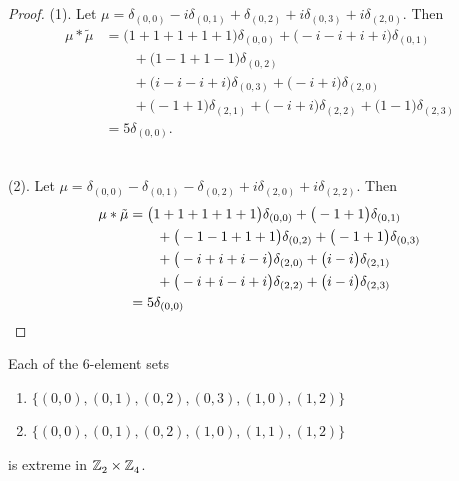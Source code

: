  
\begin{proof} (1).
Let  $\mu =  \delta_{(0,0)}-i\delta_{(0,1)}+\delta_{(0,2)}+i\delta_{(0,3)}+i\delta_{(2,0)}
$.  Then 
\begin{align*} 
\mu * \tilde \mu & = \big(1+1+1+1+1\big)\delta_{(0,0)}
+\big(-i-i+i+i\big)\delta_{(0,1)}
\\&\qquad
+\big(1-1+1-1\big)\delta_{(0,2)}
\\&\qquad
+\big(i-i-i+i\big)\delta_{(0,3)}
+\big(-i+i\big)\delta_{(2,0)}
\\&\qquad
+\big(-1+1\big)\delta_{(2,1)}
+\big(-i+i\big)\delta_{(2,2)}
+\big(1-1\big)\delta_{(2,3)}\\&=5\delta_{(0 , 0)}.
\end{align*}
\

(2).
Let  $\mu =  \delta_{(0,0)}-\delta_{(0,1)}-\delta_{(0,2)}+i\delta_{(2,0)}+i\delta_{(2,2)}
$.  Then 
\begin{align*} 
\mu * \tilde \mu & = \big(1+1+1+1+1\big)\delta_{(0,0)}
+\big(-1+1\big)\delta_{(0,1)}
\\&\qquad
+\big(-1-1+1+1\big)\delta_{(0,2)}
+\big(-1+1\big)\delta_{(0,3)}
\\&\qquad
+\big(-i+i+i-i\big)\delta_{(2,0)}
+\big(i-i\big)\delta_{(2,1)}
\\&\qquad
+\big(-i+i-i+i\big)\delta_{(2,2)}
+\big(i-i\big)\delta_{(2,3)}\\&=5\delta_{(0 , 0)}\qedhere
\end{align*}
\end{proof}




\begin{prop}\label{prop6inZ4.X.Z4}
Each of the 6-element sets 
\begin{enumerate}
\item $\{(0, 0),  (0, 1),  (0, 2),  (0, 3),  (1, 0),  (1, 2) \}$
\item $\{(0, 0),  (0, 1),  (0, 2),  (1, 0),  (1, 1),  (1, 2) \}$
\end{enumerate}
is extreme in $\texttt{$\mathbb Z_{2}^{\,}$} \times \texttt{$\mathbb Z_{4}^{\,}$}$.  
\end{prop} 

